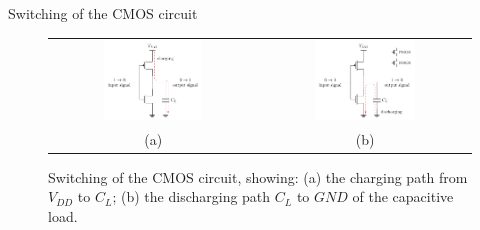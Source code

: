 \begin{frame}{Switching of the CMOS circuit}
    \begin{figure}
    \centering
    \begin{tabular}{cc}
        \includegraphics[width=0.5\textwidth]{fig/_TikZ__CMOS_charging.pdf} & \includegraphics[width=0.5\textwidth]{fig/_TikZ__CMOS_discharging.pdf} \\
        (a) & (b)
    \end{tabular}
    \caption{Switching of the CMOS circuit, showing: (a) the charging path from $V_{DD}$ to $C_L$; (b) the discharging path $C_L$ to $GND$ of the capacitive load.}
    \label{fig:cmos}
\end{figure}
\end{frame}
